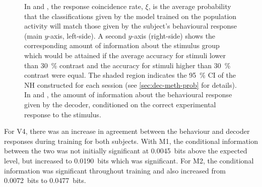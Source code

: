 \begin{figure}[htbp]
{    }
    \hspace*{\fill}
    \caption{
    In \protect{} and \protect{}, the response coincidence rate, $\xi$, is the average probability that the classifications given by the model trained on the population activity will match those given by the subject's behavioural response (main $y$-axis, left-side).
    A second $y$-axis (right-side) shows the corresponding amount of information about the stimulus group which would be attained if the average accuracy for stimuli lower than \SI{30}{\percent} contrast and the accuracy for stimuli higher than \SI{30}{\percent} contrast were equal.
    The shaded region indicates the \SI{95}{\percent} \acf{CI} of the \acf{NH} constructed for each session (see \autoref{sec:dec-meth-prob} for details).
    In \protect{} and \protect{}, the amount of information about the behavioural response given by the decoder, conditioned on the correct experimental response to the stimulus.
}
    \label{fig:decag_all_v1}
\end{figure}


For \ac{V4}, there was an increase in agreement between the behaviour and decoder responses during training for both subjects.
With \ac{M1}, the conditional information between the two was not initially significant at \SI{0.0045}{bits} above the expected level, but increased to \SI{0.0190}{bits} which was significant.
For \ac{M2}, the conditional information was significant throughout training and also increased from \SI{0.0072}{bits} to \SI{0.0477}{bits}.


%
%

